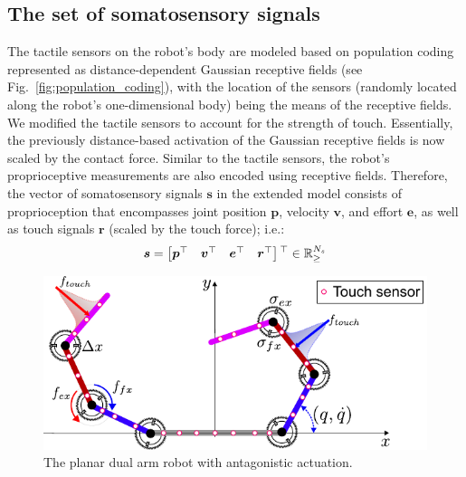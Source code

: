 \subsection{The set of somatosensory signals}
The tactile sensors on the robot's body are modeled based on population coding \cite{Panzeri2010PopulationCoding} represented as distance-dependent Gaussian receptive fields (see Fig.~\ref{fig:population_coding}), with the location of the sensors (randomly located along the robot's one-dimensional body) being the means of the receptive fields. We modified the tactile sensors to account for the strength of touch. Essentially, the previously distance-based activation of the Gaussian receptive fields is now scaled by the contact force. Similar to the tactile sensors, the robot's proprioceptive measurements are also encoded using receptive fields. Therefore, the vector of somatosensory signals $\bm{s}$ in the extended model consists of proprioception that encompasses joint position $\bm{p}$, velocity $\bm{v}$, and effort $\bm{e}$, as well as touch signals $\bm{r}$ (scaled by the touch force); i.e.:
\begin{equation}
	\bm{s} = \begin{bmatrix}
		\bm{p}{^{\top}} & \bm{v}{^{\top}} & \bm{e}{^{\top}} & \bm{r}{^{\top}}
	\end{bmatrix}{^{\top}} \in \mathbb{R}^{N_s}_{\geq}
\end{equation}
\begin{figure}[!t]
	\begin{center}
		\hspace*{\fill}
		\includegraphics[width=0.99\columnwidth]{extended_dual_arm_robot.pdf}
		\hspace*{\fill}
	\end{center}
	\caption{\label{fig:extended_dual_arm_robot} The planar dual arm robot with antagonistic actuation.}
\end{figure}


